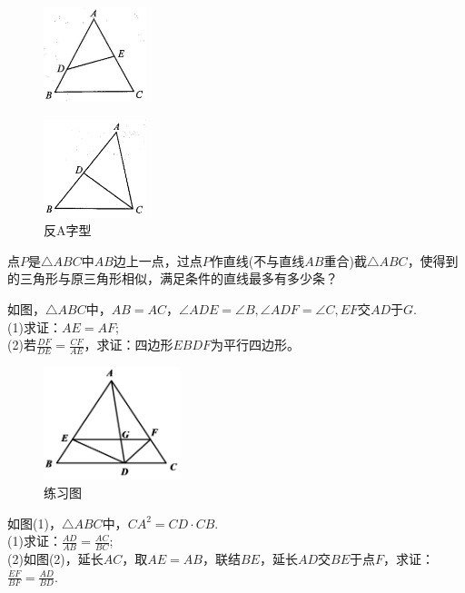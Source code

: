\documentclass{ecnuthesis}
\begin{document}
\begin{figure}[H]
\centering
\includegraphics[width=3cm]{picture/819.png}
\end{figure}
\begin{figure}[H]
\centering
\includegraphics[width=3cm]{picture/820.png}
\caption{反A字型}
\end{figure}
\begin{problem}
    点$P$是$\triangle ABC$中$AB$边上一点，过点$P$作直线(不与直线$AB$重合)截$\triangle ABC$，使得到的三角形与原三角形相似，满足条件的直线最多有多少条？
\end{problem}
\begin{problem}
    如图，$\triangle ABC$中，$AB=AC$，$\angle ADE=\angle B,\angle ADF=\angle C,EF$交$AD$于$G$. \\
    (1)求证：$AE=AF$; \\
    (2)若$\frac{DF}{DE}=\frac{CF}{AE}$，求证：四边形$EBDF$为平行四边形。 \\
\end{problem}
\begin{figure}[H]
\centering
\includegraphics[width=4cm]{picture/830.png}
\caption{练习图}
\end{figure}
\begin{problem}
    如图(1)，$\triangle ABC$中，$CA^2=CD·CB.$ \\
    (1)求证：$\frac{AD}{AB}=\frac{AC}{BC}$; \\
    (2)如图(2)，延长$AC$，取$AE=AB$，联结$BE$，延长$AD$交$BE$于点$F$，求证：$\frac{EF}{BF}=\frac{AD}{BD}.$ \\
\end{problem}
\end{document}

